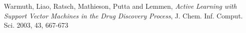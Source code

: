 \documentclass[paper=a4, fontsize=11pt]{scrartcl}
\numberwithin{equation}{section}    %
\numberwithin{figure}{section}      %
\numberwithin{table}{section}       %
\numberwithin{equation}{section}    %
\numberwithin{figure}{section}      %
\numberwithin{table}{section}       %
\begin{document}
\begin{thebibliography}{1}




Warmuth, Liao, Ratsch, Mathieson, Putta and Lemmen, \emph{Active Learning with Support Vector Machines in the Drug Discovery Process}, J. Chem. Inf. Comput. Sci. 2003, 43, 667-673

\end{thebibliography}
\end{document}
